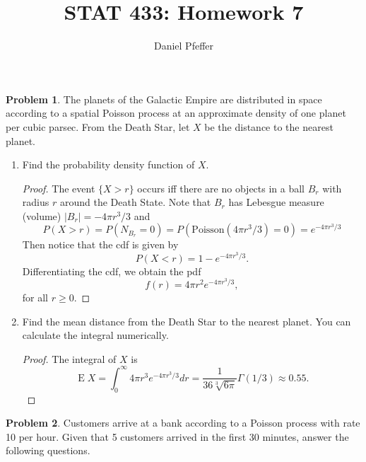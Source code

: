 \documentclass[oneside]{amsart}
\title{STAT 433: Homework 7}
\author{Daniel Pfeffer}
\DeclareMathOperator{\E}{\mathrm{E}}
\newcommand{\Pois}{\mathrm{Poisson}}
\theoremstyle{definition}
\newtheorem{prob}{Problem}
\begin{document}
\maketitle

\begin{prob}
The planets of the Galactic Empire are distributed in space according to a spatial Poisson process at an approximate density of one planet per cubic parsec. From the Death Star, let $X$ be the distance to the nearest planet.
\end{prob}

\begin{enumerate}[label=(\alph*)]
\item
Find the probability density function of $X$.
\begin{proof}
The event $\{X > r\}$ occurs iff there are no objects in a ball $B_r$ with radius $r$ around the Death State. Note that $B_r$ has Lebesgue measure (volume) $|B_r| = -4 \pi r^3/3$ and 
\[
	P(X > r) = P(N_{B_r} = 0) = P(\Pois(4 \pi r^3/3) = 0) = e^{-4 \pi r^3/3}
\]
Then notice that the cdf is given by
\[
	P(X < r) = 1- e^{-4 \pi r^3/3}.
\]
Differentiating the cdf, we obtain the pdf 
\[
	f(r) = 4 \pi r^2 e^{-4 \pi r^3/3},
\]	
for all $r \geq 0$.
\end{proof}
\item
Find the mean distance from the Death Star to the nearest planet. You can calculate the integral numerically. 
\begin{proof}
The integral of $X$ is
\[
	\E X=\int_0^\infty 4 \pi r^3 e^{-4 \pi r^3/3} dr = \frac{1}{36 \sqrt[3]{6 \pi}}\Gamma(1/3) \approx 0.55.
\]
\end{proof}
\end{enumerate}


\begin{prob}
Customers arrive at a bank according to a Poisson process with rate 10 per hour. Given that 5 customers arrived in the first 30 minutes, answer the following questions.
\end{prob}
\end{document}
